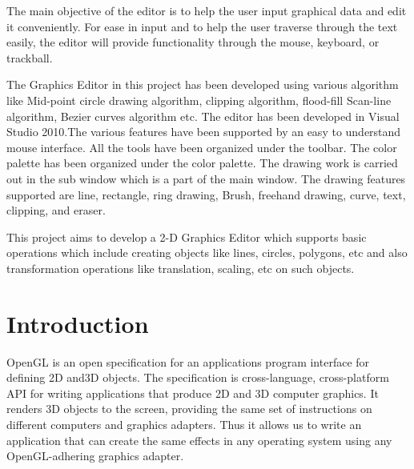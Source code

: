 \documentclass[12pt]{report}
\begin{document}
The main objective of the editor is to help the user input graphical data and edit it conveniently. For ease in input and to help the user traverse through the text easily, the editor will provide functionality through the mouse, keyboard, or trackball.



The Graphics Editor in this project has been developed using various algorithm like Mid-point circle drawing algorithm, clipping algorithm, flood-fill Scan-line algorithm, Bezier curves algorithm etc. The editor has been developed in Visual Studio 2010.The various features have been supported by an easy to understand mouse interface. All the tools have been organized under the toolbar.  The color palette has been organized under the color palette. The drawing work is carried out in the sub window which is a part of the main window. The drawing features supported are line, rectangle, ring drawing, Brush, freehand drawing, curve, text, clipping, and eraser.



 This project aims to develop a 2-D Graphics Editor which supports basic operations which include creating objects like lines, circles, polygons,  etc and also transformation operations like translation, scaling, etc on such objects.
 




\tableofcontents


\newpage

\setcounter{page}{1}

\pagestyle{fancy}
\chead{}
\rfoot{\small{\thepage}}
\renewcommand{\headrulewidth}{0.4pt}
\renewcommand{\footrulewidth}{0.4pt}
\chapter{Introduction}
OpenGL is an open specification for an applications program interface for defining 2D and3D objects. The specification is cross-language, cross-platform API for writing applications that produce 2D and 3D computer graphics. It renders 3D objects to the screen, providing the same set of instructions on different computers and graphics adapters. Thus it allows us to write an application that can create the same effects in any operating system using any OpenGL-adhering graphics adapter.
\end{document}
